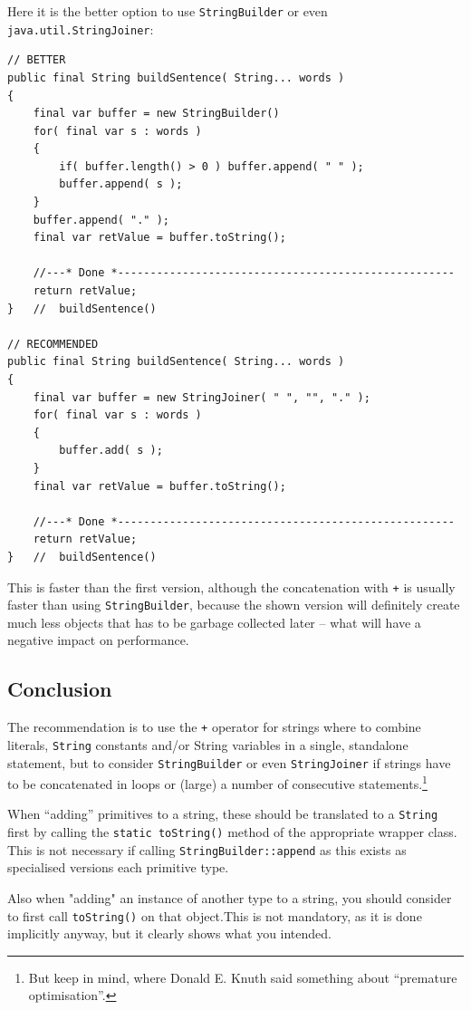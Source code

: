 \documentclass[11pt,a4paper, titlepage, parskip=half, headsepline, footsepline, cleardoublepage=current, headheight=1cm]{scrbook}
\begin{document}
Here it is the better option to use \lstinline|StringBuilder| or even \lstinline|java.util.StringJoiner|\autocite{ORACLE_DOC_STRINGJOINER_CLASS}:
\begin{lstlisting}
// BETTER
public final String buildSentence( String... words )
{
    final var buffer = new StringBuilder()
    for( final var s : words )
    {
        if( buffer.length() > 0 ) buffer.append( " " );
        buffer.append( s );
    }
    buffer.append( "." );
    final var retValue = buffer.toString();
    
    //---* Done *----------------------------------------------------
    return retValue;
}   //  buildSentence()

// RECOMMENDED
public final String buildSentence( String... words )
{
    final var buffer = new StringJoiner( " ", "", "." );
    for( final var s : words )
    {
        buffer.add( s );
    }
    final var retValue = buffer.toString();
    
    //---* Done *----------------------------------------------------
    return retValue;
}   //  buildSentence()
\end{lstlisting}

This is faster than the first version, although the concatenation with \verb#+# is usually faster than using \lstinline|StringBuilder|, because the shown version will definitely create much less objects that has to be garbage collected later – what will have a negative impact on performance.

\subsection{Conclusion}
The recommendation is to use the \verb#+# operator for strings where to combine literals, \lstinline|String| constants and/or String variables in a single, standalone statement, but to consider \lstinline|StringBuilder| or even \lstinline|StringJoiner| if strings have to be concatenated in loops or (large) a number of consecutive statements.\footnote{But keep \autocite{Knuth:PrematureOptimization} in mind, where Donald E. Knuth said something about “premature optimisation”.}

When “adding” primitives to a string, these should be translated to a \lstinline|String| first by calling the \lstinline|static toString()| method of the appropriate wrapper class. This is not necessary if calling \lstinline|StringBuilder::append| as this exists as specialised versions each primitive type.

Also when "adding" an instance of another type to a string, you should consider to first call \lstinline|toString()| on that object.This is not mandatory, as it is done implicitly anyway, but it clearly shows what you intended.
\end{document}
